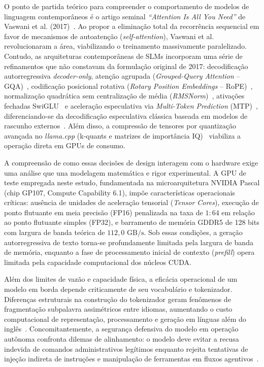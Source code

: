 \documentclass[10pt,a4paper,twocolumn]{article}
\begin{document}
O ponto de partida te\'orico para compreender o comportamento de modelos de linguagem contempor\^aneos \'e o artigo seminal \emph{``Attention Is All You Need''} de Vaswani et al. (2017)~\cite{vaswani2017}. Ao propor a elimina\c{c}\~ao total da recorr\^encia sequencial em favor de mecanismos de autoaten\c{c}\~ao (\emph{self-attention}), Vaswani et al. revolucionaram a \'area, viabilizando o treinamento massivamente paralelizado. Contudo, as arquiteturas contempor\^aneas de SLMs incorporam uma s\'erie de refinamentos que n\~ao constavam da formula\c{c}\~ao original de 2017: decodifica\c{c}\~ao autorregressiva \emph{decoder-only}, aten\c{c}\~ao agrupada (\emph{Grouped-Query Attention} -- GQA)~\cite{ainslie2023}, codifica\c{c}\~ao posicional rotativa (\emph{Rotary Position Embeddings} -- RoPE)~\cite{su2024}, normaliza\c{c}\~ao quadr\'atica sem centraliza\c{c}\~ao de m\'edia (\emph{RMSNorm})~\cite{zhang2019}, ativa\c{c}\~oes fechadas SwiGLU~\cite{shazeer2020} e acelera\c{c}\~ao especulativa via \emph{Multi-Token Prediction} (MTP)~\cite{gloeckle2024mtp}, diferenciando-se da decodifica\c{c}\~ao especulativa cl\'assica baseada em modelos de rascunho externos~\cite{leviathan2023}. Al\'em disso, a compress\~ao de tensores por quantiza\c{c}\~ao avan\c{c}ada no \emph{llama.cpp} (k-quants e matrizes de import\^ancia IQ)~\cite{gerganov2023llamacpp,dettmers2022} viabiliza a opera\c{c}\~ao direta em GPUs de consumo.

A compreens\~ao de como essas decis\~oes de design interagem com o hardware exige uma an\'alise que una modelagem matem\'atica e rigor experimental. A GPU de teste empregada neste estudo, fundamentada na microarquitetura NVIDIA Pascal (chip GP107, Compute Capability 6.1), imp\~oe caracter\'isticas operacionais cr\'iticas: aus\^encia de unidades de acelera\c{c}\~ao tensorial (\emph{Tensor Cores}), execu\c{c}\~ao de ponto flutuante em meia precis\~ao (FP16) penalizada na taxa de $1:64$ em rela\c{c}\~ao ao ponto flutuante simples (FP32), e barramento de mem\'oria GDDR5 de 128 bits com largura de banda te\'orica de $112,0\text{ GB/s}$. Sob essas condi\c{c}\~oes, a gera\c{c}\~ao autorregressiva de texto torna-se profundamente limitada pela largura de banda de mem\'oria, enquanto a fase de processamento inicial de contexto (\emph{prefill}) opera limitada pela capacidade computacional dos n\'ucleos CUDA.

Al\'em dos limites de vaz\~ao e capacidade f\'isica, a efic\'acia operacional de um modelo em borda depende criticamente de seu vocabul\'ario e tokenizador. Diferen\c{c}as estruturais na constru\c{c}\~ao do tokenizador geram fen\^omenos de fragmenta\c{c}\~ao subpalavra assim\'etricos entre idiomas, aumentando o custo computacional de representa\c{c}\~ao, processamento e gera\c{c}\~ao em l\'inguas al\'em do ingl\^es~\cite{petrov2023,ahia2023}. Concomitantemente, a seguran\c{c}a defensiva do modelo em opera\c{c}\~ao aut\^onoma confronta dilemas de alinhamento: o modelo deve evitar a recusa indevida de comandos administrativos leg\'itimos enquanto rejeita tentativas de inje\c{c}\~ao indireta de instru\c{c}\~oes e manipula\c{c}\~ao de ferramentas em fluxos agentivos~\cite{cheng2024,debenedetti2024}.
\end{document}
